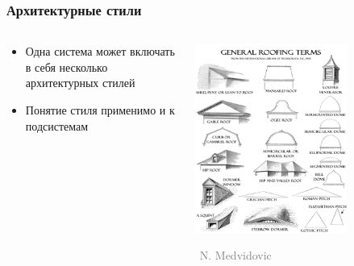 \documentclass[xetex,mathserif,serif]{beamer}
\newcommand{\attribution}[1] {
    \vspace{-5mm}\begin{flushright}\begin{scriptsize}\textcolor{gray}{\textcopyright\, #1}\end{scriptsize}\end{flushright}
}
\begin{document}
    \begin{frame}
        \frametitle{Архитектурные стили}
        \begin{columns}
            \begin{column}{0.5\textwidth}
                \begin{itemize}
                    \item Одна система может включать в себя несколько архитектурных стилей
                    \item Понятие стиля применимо и к подсистемам
                \end{itemize}
            \end{column}
            \begin{column}{0.5\textwidth}
                \begin{center}
                    \includegraphics[width=0.7\textwidth]{roofStyles.png}
                    \attribution{N. Medvidovic}
                \end{center}
            \end{column}
        \end{columns}
    \end{frame}
\end{document}
